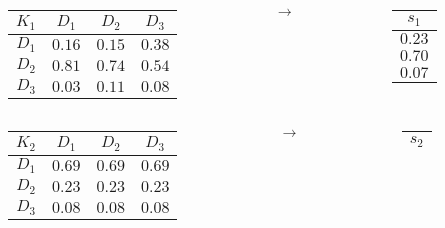 \documentclass{beamer}
\begin{document}
\begin{frame}
	\begin{columns}
		\begin{column}{0.4\textwidth}
			\begin{table}
				\begin{tabular}{c|c|c|c}
				$K_1$	&	$D_1$	&	$D_2$	&	$D_3$\\ \hline
				$D_1$	&	$0.16$	&	$0.15$	&	$0.38$\\ \hline
				$D_2$	&	$0.81$	&	$0.74$	&	$0.54$\\ \hline
				$D_3$	&	$0.03$	&	$0.11$	&	$0.08$
				\end{tabular}
			\end{table}
		\end{column}
		\begin{column}{0.1\textwidth}
			$\rightarrow$
		\end{column}
		\begin{column}{0.1\textwidth}
			\begin{table}
				\begin{tabular}{c}
				$s_1$\\ \hline
				$0.23$\\
				$0.70$\\
				$0.07$
				\end{tabular}
			\end{table}
		\end{column}
	\end{columns}
	\begin{columns}
		\begin{column}{0.4\textwidth}
			\begin{table}
				\begin{tabular}{c|c|c|c}
				$K_2$	&	$D_1$	&	$D_2$	&	$D_3$\\ \hline
				$D_1$	&	$0.69$	&	$0.69$	&	$0.69$\\ \hline
				$D_2$	&	$0.23$	&	$0.23$	&	$0.23$\\ \hline
				$D_3$	&	$0.08$	&	$0.08$	&	$0.08$
				\end{tabular}
			\end{table}
		\end{column}
		\begin{column}{0.1\textwidth}
			$\rightarrow$
		\end{column}
		\begin{column}{0.1\textwidth}
			\begin{table}
				\begin{tabular}{c}
				$s_2$\\ \hline

\end{tabular}
\end{table}
\end{column}
\end{columns}
\end{frame}
\end{document}
